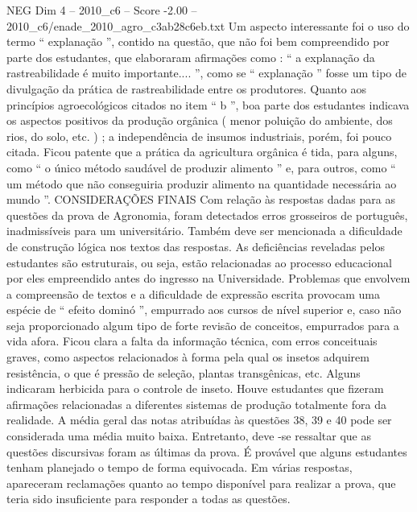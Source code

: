 \begin{textsample}{NEG Dim 4 – 2010\_c6 – Score -2.00 – 2010\_c6/enade\_2010\_agro\_c3ab28c6eb.txt}
Um aspecto interessante foi o uso do termo “ explanação ”, contido na questão, que não foi bem compreendido por parte dos estudantes, que elaboraram afirmações como : “ a explanação da rastreabilidade é muito importante.... ”, como se “ explanação ” fosse um tipo de divulgação da prática de rastreabilidade entre os produtores.
Quanto aos princípios agroecológicos citados no item “ b ”, boa parte dos estudantes indicava os aspectos positivos da produção orgânica ( menor poluição do ambiente, dos rios, do solo, etc. ) ; a independência de insumos industriais, porém, foi pouco citada.
Ficou patente que a prática da agricultura orgânica é tida, para alguns, como “ o único método saudável de produzir alimento ” e, para outros, como “ um método que não conseguiria produzir alimento na quantidade necessária ao mundo ”.
CONSIDERAÇÕES FINAIS Com relação às respostas dadas para as questões da prova de Agronomia, foram detectados erros grosseiros de português, inadmissíveis para um universitário.
Também deve ser mencionada a dificuldade de construção lógica nos textos das respostas.
As deficiências reveladas pelos estudantes são estruturais, ou seja, estão relacionadas ao processo educacional por eles empreendido antes do ingresso na Universidade.
Problemas que envolvem a compreensão de textos e a dificuldade de expressão escrita provocam uma espécie de “ efeito dominó ”, empurrado aos cursos de nível superior e, caso não seja proporcionado algum tipo de forte revisão de conceitos, empurrados para a vida afora.
Ficou clara a falta da informação técnica, com erros conceituais graves, como aspectos relacionados à forma pela qual os insetos adquirem resistência, o que é pressão de seleção, plantas transgênicas, etc.
Alguns indicaram herbicida para o controle de inseto.
Houve estudantes que fizeram afirmações relacionadas a diferentes sistemas de produção totalmente fora da realidade.
A média geral das notas atribuídas às questões 38, 39 e 40 pode ser considerada uma média muito baixa.
Entretanto, deve -se ressaltar que as questões discursivas foram as últimas da prova.
É provável que alguns estudantes tenham planejado o tempo de forma equivocada.
Em várias respostas, apareceram reclamações quanto ao tempo disponível para realizar a prova, que teria sido insuficiente para responder a todas as questões.

\end{textsample}
